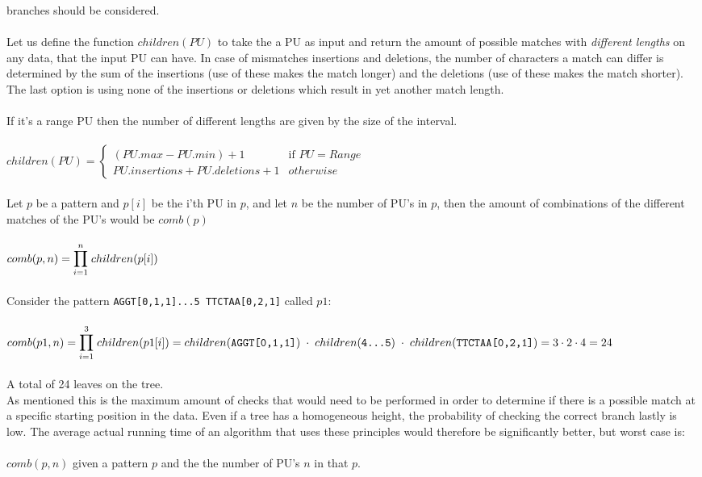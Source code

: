 \documentclass[12pt]{article}
\newcommand{\pu}{PU }
\newcommand{\pus}{PU's }
\begin{document}
branches should be considered. \\ \\
Let us define the function $children(\pu)$ to take the a \pu as input and return the amount of possible matches with	
\textit{different lengths} on any data, that the input \pu can have.
In case of mismatches insertions and deletions, the number of characters a match can differ is determined by 
the sum of the insertions (use of these makes the match longer)
and the deletions (use of these makes the match shorter). The last option is using none of the insertions or deletions which
result in yet another match length. \\ \\
If it's a range \pu then the number of different lengths are given by the size of the interval. \\ \\
$children(PU)=
\left\{
\begin{array}{ll}
(PU.max - PU.min) + 1 & \mbox{if } PU=Range \\
PU.insertions+PU.deletions+1 & otherwise 
\end{array}
\right.$
 \\ \\
Let $p$ be a pattern and $p[i]$ be the i'th \pu in $p$, and let $n$ be the number of \pus in $p$,
then the amount of combinations of the different matches of the \pus would be $comb(p)$ \\ \\
$comb(p,n)=\mathlarger{\mathlarger{\prod}_{i=1}^{n}\;children(p[i])}$ \\ \\
Consider the pattern \texttt{AGGT[0,1,1]...5\; TTCTAA[0,2,1]} called $p1$: \\ \\
$comb(p1,n)=\mathlarger{\mathlarger{\prod}_{i=1}^{3}\;children(p1[i])}= \\ \\
children(\texttt{AGGT[0,1,1]})\;\cdot \;children(\texttt{4...5})\;\cdot \;children(\texttt{TTCTAA[0,2,1]})=
3\cdot 2\cdot 4=24$ \\ \\
A total of 24 leaves on the tree. \\
As mentioned this is the maximum amount of checks that would need to be performed in order to determine if there is a 
possible match at a specific starting position in the data. Even if a tree has a homogeneous 
height, the probability of checking the correct branch lastly is low.
The average actual running time of an algorithm that uses these principles would therefore be significantly better, 
but worst case is: \\ \\
$comb(p,n)$ given a pattern $p$ and the the number of \pus $n$ in that $p$.
\end{document}
